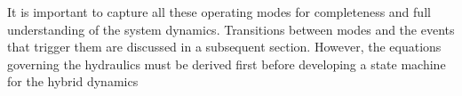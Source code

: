 It is important to capture all these operating modes for completeness and full understanding of the system dynamics. Transitions between modes and the events that trigger them are discussed in a subsequent section. However, the equations governing the hydraulics must be derived first before developing a state machine for the hybrid dynamics